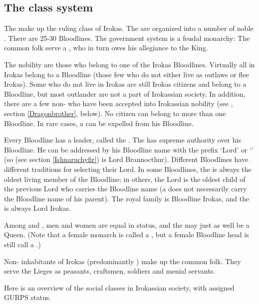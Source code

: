 \subsection{The class system}
The \dragons{} make up the ruling class of Irokas. The \dragons{} are organized into a number of noble . There are 25-30 Bloodlines. The government system is a feudal monarchy: The common folk serve a , who in turn owes his allegiance to the King. 

The nobility are those who belong to one of the Irokas Bloodlines. Virtually all \dragons{} in Irokas belong to a Bloodline (those few who do not either live as outlaws or flee Irokas). Some \dragons{} who do not live in Irokas are still Irokas citizens and belong to a Bloodline, but most outlander \dragons{} are not a part of Irokassian society. In addition, there are a few non-\dragons{} who have been accepted into Irokassian nobility (see \dragonbrothers{}, section \ref{Dragonbrother}, below). No citizen can belong to more than one Bloodline. In rare cases, a \dragon{} can be expelled from his Bloodline. 

Every Bloodline has a leader, called the \intro{\dragonlord{}}. The \dragonlord{} has supreme authority over his Bloodline. He can be addressed by his Bloodline name with the prefix `Lord' or `\dragonlord{}' (so \Ishnaruchyfir{} (see section \ref{Ishnaruchyfir}) is Lord Brannocthur). Different Bloodlines have different traditions for selecting their Lord. In some Bloodlines, the \dragonlord{} is always the oldest living member of the Bloodline; in others, the Lord is the oldest child of the previous Lord who carries the Bloodline name (a \dragon{} does not necessarily carry the Bloodline name of his parent). The royal family is Bloodline Irokas, and the \DragonKing{} is always Lord Irokas. 

Among \dragons{} and \dragonbrothers{}, men and women are equal in status, and the \DragonKing{} may just as well be a Queen. (Note that a female monarch is called a \DragonQueen, but a female Bloodline head is still call a \dragonlord{}.)  

Non-\dragon{} inhabitants of Irokas (predominantly \scathaese) make up the common folk. They serve the \dragon{} Lieges as peasants, craftsmen, soldiers and menial servants. 


Here is an overview of the social classes in Irokassian society, with assigned GURPS status. 

